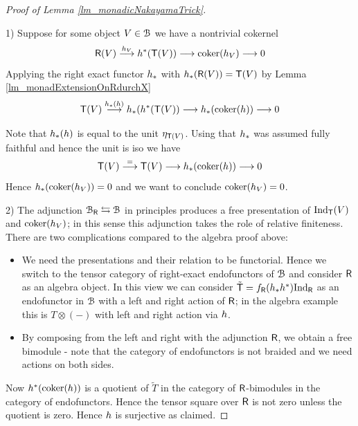 \documentclass[a4paper, reqno]{amsart}
\theoremstyle{introTheorems}
\newcommand{\coker}{\textup{coker}}
\renewcommand{\1}{\mathbbold{1}}
\begin{document}
\begin{proof}[Proof of Lemma \ref{lm_monadicNakayamaTrick}] ~

1) Suppose for some object $V\in\mathcal{B}$ we have a nontrivial cokernel   
$$\monR(V)\stackrel{\fpullback_V}{\longrightarrow}
\fpullback^*(\monT(V))
\longrightarrow \coker(\fpullback_V)
\longrightarrow 0$$
Applying the right exact functor $h_*$  with $h_*({\mathsf{R}}(V))={\mathsf{T}}(V)$ by Lemma  \ref{lm_monadExtensionOnRdurchX}
%
$$\monT(V)\stackrel{\fpullback_*(\fpullback)}{\longrightarrow} \fpullback_*(\fpullback^*(\monT(V))
\longrightarrow \fpullback_*(\coker(\fpullback))
\longrightarrow 0$$

Note that $h_*(h)$ is equal to the unit $\eta_{{\mathsf{T}}(V)}$.
Using that $h_*$ was assumed fully faithful and hence the unit is iso we have 
%
$$\monT(V)\stackrel{=}{\longrightarrow} \monT(V)
\longrightarrow \fpullback_*(\coker(\fpullback))
\longrightarrow 0$$
Hence $\fpullback_*(\coker(\fpullback_V))=0$ and we want to conclude $\coker(\fpullback_V)=0$. 

\bigskip

2) The adjunction $\mathcal{B}_{\mathsf{R}}\leftrightarrows\mathcal{B}$ in principles produces a free presentation of $\textup{Ind}_{\mathsf{T}}(V)$ and $\coker(\fpullback_V)$; in this sense this adjunction takes the role of relative finiteness. There are two complications compared to the algebra proof above:
\begin{itemize}
\item We need the presentations and their relation to be functorial. Hence we switch to the tensor category of right-exact endofunctors of $\mathcal{B}$ and consider ${\mathsf{R}}$ as an algebra object. In this view we can consider $\tilde{{\mathsf{T}}}=f_{\mathsf{R}}(h_*h^*)\textup{Ind}_{{\mathsf{R}}}$ as an endofunctor in $\mathcal{B}$ with a left and right action of ${\mathsf{R}}$; in the algebra example this is $T\otimes(-)$ with left and right action via $h$.
\item By composing from the left and right with the adjunction ${\mathsf{R}}$, we obtain a free bimodule - note that the category of endofunctors is not braided and we need actions on both sides.
\end{itemize}

Now $\fpullback^*(\coker(\fpullback))$ is a quotient of $\tilde{T}$ in the category of ${\mathsf{R}}$-bimodules in the category of endofunctors. 
Hence the tensor square over ${\mathsf{R}}$ is not zero unless the quotient is zero. Hence $h$ is surjective as claimed.
\end{proof}
\end{document}
